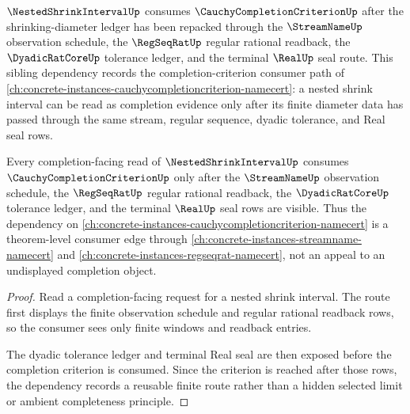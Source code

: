 $\NestedShrinkIntervalUp$ consumes $\CauchyCompletionCriterionUp$ after the shrinking-diameter ledger has been repacked through the $\StreamNameUp$ observation schedule, the $\RegSeqRatUp$ regular rational readback, the $\DyadicRatCoreUp$ tolerance ledger, and the terminal $\RealUp$ seal route. This sibling dependency records the completion-criterion consumer path of \autoref{ch:concrete-instances-cauchycompletioncriterion-namecert}: a nested shrink interval can be read as completion evidence only after its finite diameter data has passed through the same stream, regular sequence, dyadic tolerance, and Real seal rows.

\begin{theorem}
\label{thm:nested-shrink-interval-cauchy-completion-consumer}
Every completion-facing read of $\NestedShrinkIntervalUp$ consumes $\CauchyCompletionCriterionUp$ only after the $\StreamNameUp$ observation schedule, the $\RegSeqRatUp$ regular rational readback, the $\DyadicRatCoreUp$ tolerance ledger, and the terminal $\RealUp$ seal rows are visible. Thus the dependency on \autoref{ch:concrete-instances-cauchycompletioncriterion-namecert} is a theorem-level consumer edge through \autoref{ch:concrete-instances-streamname-namecert} and \autoref{ch:concrete-instances-regseqrat-namecert}, not an appeal to an undisplayed completion object.
\end{theorem}
\begin{proof}
Read a completion-facing request for a nested shrink interval. The route first displays the finite observation schedule and regular rational readback rows, so the consumer sees only finite windows and readback entries.

The dyadic tolerance ledger and terminal Real seal are then exposed before the completion criterion is consumed. Since the criterion is reached after those rows, the dependency records a reusable finite route rather than a hidden selected limit or ambient completeness principle.
\end{proof}
